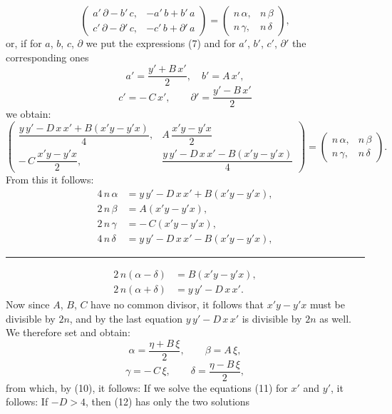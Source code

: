 \[
\begin{pmatrix} a'\,\partial - b'\,c, & -a'\,b + b'\,a\\ c'\,\partial - \partial'\,c, & -c'\,b + \partial'\,a \end{pmatrix} = \begin{pmatrix} n\,\alpha, & n\,\beta\\ n\,\gamma, & n\,\delta \end{pmatrix},
\]
or, if for $a$, $b$, $c$, $\partial$ we put the expressions (7) and for
$a'$, $b'$, $c'$, $\partial'$ the corresponding ones
\[
a' = \frac{y'+B\,x'}{2}, \quad b' = A\,x',
\]
\[
c' = -\,C\,x', \qquad \partial' = \frac{y'-B\,x'}{2}
\]
we obtain:
\[
\begin{pmatrix} \dfrac{y\,y'-D\,x\,x'+B(x'y-y'x)}{4}, & A\,\dfrac{x'y-y'x}{2}\\[2ex] -\,C\,\dfrac{x'y-y'x}{2}, & \dfrac{y\,y'-D\,x\,x'-B(x'y-y'x)}{4} \end{pmatrix} = \begin{pmatrix} n\,\alpha, & n\,\beta\\ n\,\gamma, & n\,\delta \end{pmatrix}.
\]
From this it follows:
\[
\begin{aligned}
4\,n\,\alpha &= y\,y' - D\,x\,x' + B(x'y-y'x),\\
2\,n\,\beta &= A(x'y-y'x),\\
2\,n\,\gamma &= -\,C(x'y-y'x),\\
4\,n\,\delta &= y\,y' - D\,x\,x' - B(x'y-y'x),
\end{aligned}
\]
\begin{center}\rule{0.32\linewidth}{0.4pt}\end{center}
\[
\begin{aligned}
2\,n(\alpha-\delta) &= B(x'y-y'x),\\
2\,n(\alpha+\delta) &= y\,y' - D\,x\,x'.
\end{aligned}
\]
Now since $A$, $B$, $C$ have no common divisor, it follows that $x'y -
y'x$ must be divisible by $2n$, and by the last equation
$y\,y' - D\,x\,x'$ is divisible by $2n$ as well. We therefore set
and obtain:
\[
\alpha = \frac{\eta+B\,\xi}{2}, \qquad \beta = A\,\xi,
\]
\[
\gamma = -\,C\,\xi, \qquad \delta = \frac{\eta-B\,\xi}{2},
\]
from which, by (10), it follows:
If we solve the equations (11) for $x'$ and $y'$, it follows:
If $-D > 4$, then (12) has only the two solutions
